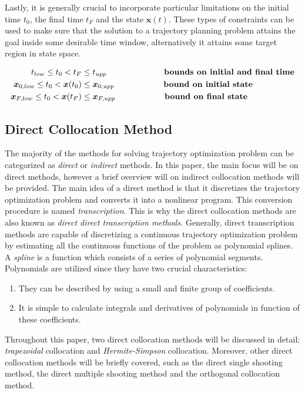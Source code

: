 \documentclass{thesisreport}
\begin{document}
Lastly, it is generally crucial to incorporate particular limitations on the initial time $t_0$, the final time $t_F$ and the state $\bm{x}(t)$. These types of constraints can be used to make sure that the solution to a trajectory planning problem attains the goal inside some desirable time window, alternatively it attains some target region in state space.


\begin{align}
t_{low} \leq t_0 < t_F &\leq t_{upp} \text{\hspace{2.35cm} \textbf{bounds on initial and final time}}\\
\bm{x}_{0,low} \leq t_0 < \bm{x}(t_0) &\leq \bm{x}_{0,upp} \text{\hspace{2cm} \textbf{bound on initial state}}\\
\bm{x}_{F,low} \leq t_0 < \bm{x}(t_F) &\leq \bm{x}_{F,upp} \text{\hspace{2cm} \textbf{bound on final state}}
\end{align}
 
 
 \subsection{Direct Collocation Method}
 
 The majority of the methods for solving trajectory optimization problem can be categorized as \textit{direct} or \textit{indirect} methods. In this paper, the main focus will be on direct methods,  however a brief overview will on indirect collocation methods will be provided. The main idea of a direct method is that it discretizes the trajectory optimization problem and converts it into a nonlinear program. This conversion procedure is named \textit{transcription}. This is why the direct collocation methods are also known as \textit{direct direct transcription methods.} Generally, direct transcription methods are capable of discretizing a continuous trajectory optimization problem by estimating all the continuous functions of the problem as polynomial splines. A \textit{spline} is a function which consists of a series of polynomial segments. Polynomials are utilized since they have two crucial characteristics:
 
 \begin{enumerate}
 	\item They can be described by using a small and finite  group of coefficients.
 	\item It is simple to calculate integrals and derivatives of polynomials in function of these coefficients.
 \end{enumerate}
 Throughout this paper, two direct collocation methods will be discussed in detail: \textit{trapezoidal} collocation and \textit{Hermite-Simpson} collocation. Moreover, other direct collocation methods will be briefly covered, such as the direct single shooting method, the direct multiple shooting method and the orthogonal collocation method.
 
\end{document}

